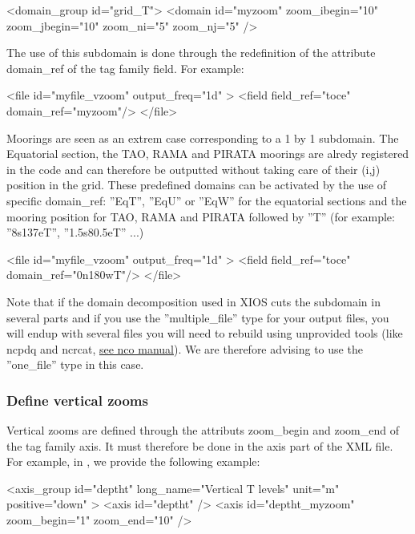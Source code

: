 \documentclass[../tex_main/NEMO_manual]{subfiles}
\begin{document}
\begin{xmllines}
<domain_group id="grid_T">
	<domain id="myzoom" zoom_ibegin="10" zoom_jbegin="10" zoom_ni="5" zoom_nj="5" />
\end{xmllines}

The use of this subdomain is done through the redefinition of the attribute domain\_ref of 
the tag family field.
For example:

\begin{xmllines}
<file id="myfile_vzoom" output_freq="1d" >
	<field field_ref="toce" domain_ref="myzoom"/>
</file>
\end{xmllines}

Moorings are seen as an extrem case corresponding to a 1 by 1 subdomain. 
The Equatorial section, the TAO, RAMA and PIRATA moorings are alredy registered in the code and 
can therefore be outputted without taking care of their (i,j) position in the grid.
These predefined domains can be activated by the use of specific domain\_ref:
''EqT'', ''EqU'' or ''EqW'' for the equatorial sections and the mooring position for 
TAO, RAMA and PIRATA followed by ''T'' (for example: ''8s137eT'', ''1.5s80.5eT'' ...)

\begin{xmllines}
<file id="myfile_vzoom" output_freq="1d" >
	<field field_ref="toce" domain_ref="0n180wT"/>
</file>
\end{xmllines}

Note that if the domain decomposition used in XIOS cuts the subdomain in several parts and if 
you use the ''multiple\_file'' type for your output files, 
you will endup with several files you will need to rebuild using unprovided tools (like ncpdq and ncrcat, 
\href{http://nco.sourceforge.net/nco.html#Concatenation}{see nco manual}).
We are therefore advising to use the ''one\_file'' type in this case.

\subsubsection{Define vertical zooms}

Vertical zooms are defined through the attributs zoom\_begin and zoom\_end of the tag family axis. 
It must therefore be done in the axis part of the XML file. 
For example, in , we provide the following example:

\begin{xmllines}
<axis_group id="deptht" long_name="Vertical T levels" unit="m" positive="down" >
	<axis id="deptht" />
	<axis id="deptht_myzoom" zoom_begin="1" zoom_end="10" />
\end{xmllines}
\end{document}

